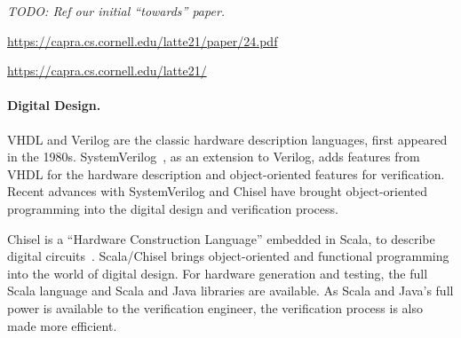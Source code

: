 \documentclass[fleqn,12pt]{article}
\newcommand{\todo}[1]{{\it TODO: #1}}
\begin{document}
\todo{Ref our initial ``towards'' paper.}

\url{https://capra.cs.cornell.edu/latte21/paper/24.pdf}

\url{https://capra.cs.cornell.edu/latte21/}


\paragraph{Digital Design.}
VHDL and Verilog are the classic hardware description languages, first appeared in the 1980s.
SystemVerilog~\cite{SystemVerilog}, as an extension to Verilog, adds features from VHDL
for the hardware description and object-oriented features for verification.
Recent advances with SystemVerilog and Chisel \cite{chisel:dac2012, chisel:book} have
brought object-oriented programming into the digital design and verification process.

Chisel is a ``Hardware Construction Language'' embedded in Scala, to describe digital circuits~\cite{chisel:dac2012}.
Scala/Chisel brings object-oriented and functional programming into the world of digital design.
For hardware generation and testing, the full Scala language and Scala and Java libraries are available.
As Scala and Java's full power is available to the verification engineer,
the verification process is also made more efficient.


%
\end{document}
